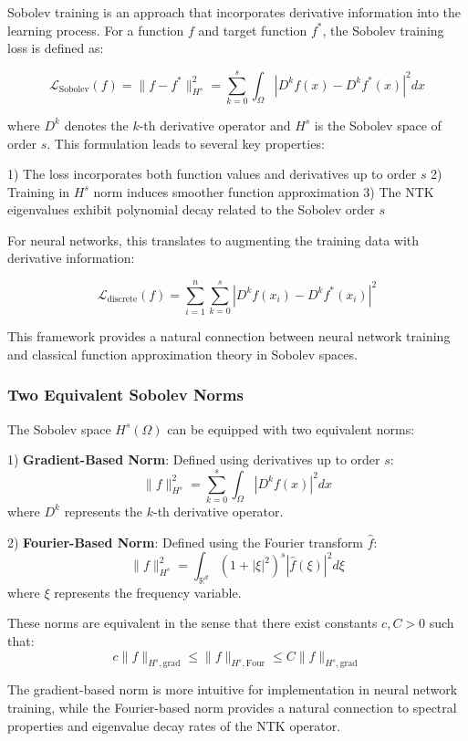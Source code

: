 \documentclass[a4paper]{article}
\begin{document}
Sobolev training is an approach that incorporates derivative information into the learning process. For a function $f$ and target function $f^*$, the Sobolev training loss is defined as:

$$\mathcal{L}_{\text{Sobolev}}(f) = \|f - f^*\|_{H^s}^2 = \sum_{k=0}^s \int_{\Omega} |D^k f(x) - D^k f^*(x)|^2 dx$$

where $D^k$ denotes the $k$-th derivative operator and $H^s$ is the Sobolev space of order $s$. This formulation leads to several key properties:

1) The loss incorporates both function values and derivatives up to order $s$
2) Training in $H^s$ norm induces smoother function approximation
3) The NTK eigenvalues exhibit polynomial decay related to the Sobolev order $s$

For neural networks, this translates to augmenting the training data with derivative information:

$$\mathcal{L}_{\text{discrete}}(f) = \sum_{i=1}^n \sum_{k=0}^s |D^k f(x_i) - D^k f^*(x_i)|^2$$

This framework provides a natural connection between neural network training and classical function approximation theory in Sobolev spaces.

\subsubsection{Two Equivalent Sobolev Norms}

The Sobolev space $H^s(\Omega)$ can be equipped with two equivalent norms:

1) \textbf{Gradient-Based Norm}: Defined using derivatives up to order $s$:
$$\|f\|_{H^s}^2 = \sum_{k=0}^s \int_{\Omega} |D^k f(x)|^2 dx$$
where $D^k$ represents the $k$-th derivative operator.

2) \textbf{Fourier-Based Norm}: Defined using the Fourier transform $\hat{f}$:
$$\|f\|_{H^s}^2 = \int_{\mathbb{R}^d} (1 + |\xi|^2)^s |\hat{f}(\xi)|^2 d\xi$$
where $\xi$ represents the frequency variable.

These norms are equivalent in the sense that there exist constants $c, C > 0$ such that:
$$c\|f\|_{H^s,\text{grad}} \leq \|f\|_{H^s,\text{Four}} \leq C\|f\|_{H^s,\text{grad}}$$

The gradient-based norm is more intuitive for implementation in neural network training, while the Fourier-based norm provides a natural connection to spectral properties and eigenvalue decay rates of the NTK operator.
\end{document}
